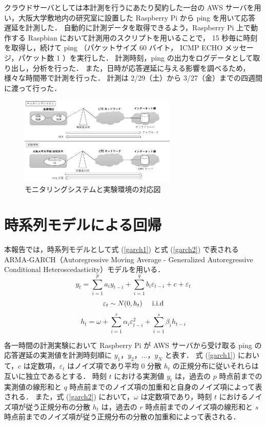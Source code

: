\documentclass[technicalreport]{ieicej}
\begin{document}
クラウドサーバとしては本計測を行うにあたり契約した一台の AWS サーバを用い，大阪大学敷地内の研究室に設置した Raspberry Pi から ping を用いて応答遅延を計測した．
自動的に計測データを取得できるよう，Raspberry Pi 上で動作する Raspbian において計測用のスクリプトを用いることで， 15 秒毎に時刻を取得し，続けて ping （パケットサイズ 60 バイト， ICMP ECHO メッセージ，パケット数 1 ）を実行した．
計測時刻，ping の出力をログデータとして取り出し，分析を行った．
また，日時が応答遅延に与える影響を調べるため，様々な時間帯で計測を行った．
計測は 2/29（土）から 3/27（金）までの四週間に渡って行った．

\begin{figure}[tb]
\centering
\includegraphics[width=7.5cm]{experiment.pdf}
\caption{モニタリングシステムと実験環境の対応図}
\label{exp}
\end{figure}

\section{時系列モデルによる回帰}
本報告では，時系列モデルとして式 (\ref{garch1}) と式 (\ref{garch2}) で表される ARMA-GARCH（Autoregressive Moving Average - Generalized Autoregressive Conditional Heteroscedasticity）モデル\cite{arma-garch}を用いる．
\begin{equation}
y_t = \sum_{i=1}^p a_i y_{t-i} + \sum_{i=1}^q b_i \varepsilon_{t-i} + c + \varepsilon_{t} 
\label{garch1}
\end{equation}
$$\varepsilon_t \sim N(0,h_t) \hspace{0.5cm} \rm{i.i.d}$$
\begin{equation}
\displaystyle h_{t} = \omega + \sum_{i=1}^{r}\alpha_i\varepsilon_{t-i}^2 + \sum_{i=1}^{s}\beta_ih_{t-i}
\label{garch2}
\end{equation}

各一時間の計測実験において Raspberry Pi が AWS サーバから受け取る ping の応答遅延の実測値を計測時刻順に $y_1$，$y_2$，...，$y_N$ と表す．
式 (\ref{garch1}) において，$c$ は定数項，$\varepsilon_t$ はノイズ項であり平均 0 分散 $h_t$ の正規分布に従いそれらは互いに独立であるとする．
時刻 $t$ における実測値 $y_t$ は，過去の $p$ 時点前までの実測値の線形和と $q$ 時点前までのノイズ項の加重和と自身のノイズ項によって表される．
また，式 (\ref{garch2}) において，$\omega$ は定数項であり，時刻 $t$ におけるノイズ項が従う正規分布の分散 $h_t$ は，過去の $r$ 時点前までのノイズ項の線形和と $s$ 時点前までのノイズ項が従う正規分布の分散の加重和によって表される．
\end{document}
